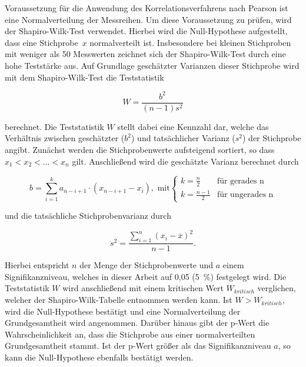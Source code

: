 Voraussetzung für die Anwendung des Korrelationsverfahrens nach Pearson ist eine Normalverteilung der Messreihen. Um diese Voraussetzung zu prüfen, wird der Shapiro-Wilk-Test verwendet. Hierbei wird die Null-Hypothese aufgestellt, dass eine Stichprobe~$x$ normalverteilt ist. Insbesondere bei kleinen Stichproben mit weniger als 50 Messwerten zeichnet sich der Shapiro-Wilk-Test durch eine hohe Teststärke aus. Auf Grundlage geschätzter Varianzen dieser Stichprobe wird mit dem Shapiro-Wilk-Test die Teststatistik

\begin{equation}
W =  \frac{b^2}{(n - 1)s^2}
	\label{eq:shapiro}
\end{equation}

berechnet. Die Teststatistik $W$ stellt dabei eine Kennzahl dar, welche das Verhältnis zwischen geschätzter ($b^2$) und tatsächlicher Varianz ($s^2$) der Stichprobe angibt. Zunächst werden die Stichprobenwerte aufsteigend sortiert, so dass $x_1 < x_2 < ... < x_n$ gilt. Anschließend wird die geschätzte Varianz berechnet durch

\begin{equation}
b =  \sum \limits_{i=1}^k a_{n-i+1} \cdot (x_{n-i+1} - x_i), \text{ mit} \begin{cases}
     k = \frac{n}{2} & \text{für gerades n}\\
     k = \frac{n-1}{2} & \text{für ungerades n}
   \end{cases}
	\label{eq:var1}
\end{equation}

und die tatsächliche Stichprobenvarianz durch 

\begin{equation}
s^2 = \frac{\sum \limits_{i=1}^n (x_i - \overline{x})^2}{n - 1}.
	\label{eq:var1}
\end{equation}

Hierbei entspricht $n$ der Menge der Stichprobenwerte und $a$ einem Signifikanzniveau, welches in dieser Arbeit auf 0,05 (5~\%) festgelegt wird. Die Teststatistik $W$ wird anschließend mit einem kritischen Wert $W_{kritisch}$ verglichen, welcher der Shapiro-Wilk-Tabelle entnommen werden kann. Ist $W > W_{kritisch}$, wird die Null-Hypothese bestätigt und eine Normalverteilung der Grundgesamtheit wird angenommen. Darüber hinaus gibt der p-Wert die Wahrscheinlichkeit an, dass die Stichprobe aus einer normalverteilten Grundgesamtheit stammt. Ist der p-Wert größer als das Signifikanzniveau $a$, so kann die Null-Hypothese ebenfalls bestätigt werden. \parencite{frank_einfach_2006, shapiro_analysis_1965}


